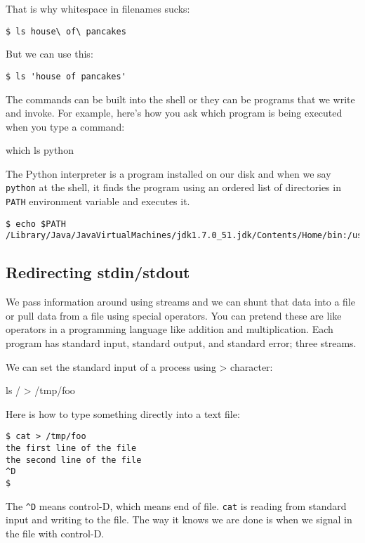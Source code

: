 \begin{fullwidth}
That is why whitespace in filenames sucks:

\begin{lstlisting}[style=BashInputStyle]
$ ls house\ of\ pancakes
\end{lstlisting}

\noindent But we can use this:

\begin{lstlisting}[style=BashInputStyle]
$ ls 'house of pancakes'
\end{lstlisting}

The commands can be built into the shell or they can be programs that we write and invoke.  For example, here's how you ask which program is being executed when you type a command:

{\small
\bash[script,stdout,prefix=$]
which ls python
\END
}

The Python interpreter is a program installed on our disk and when we say {\tt python} at the shell, it finds the program using an ordered list of directories in {\tt PATH} environment variable and executes it.

\begin{lstlisting}[style=BashInputStyle]
$ echo $PATH
/Library/Java/JavaVirtualMachines/jdk1.7.0_51.jdk/Contents/Home/bin:/usr/local/bin:...
\end{lstlisting}

\subsection{Redirecting stdin/stdout}

We pass information around using streams and we can shunt that data into a file or pull data from a file using special operators. You can pretend these are like operators in a programming language like addition and multiplication. Each program has standard input, standard output, and standard error; three streams. 

We can set the standard input of a process using > character:

{\small
\bash[script,stdout,prefix=$]
ls / > /tmp/foo
\END
}

Here is how to type something directly into a text file:
 
\begin{lstlisting}[style=BashInputStyle]
$ cat > /tmp/foo
the first line of the file
the second line of the file
^D
$ 
\end{lstlisting}

\noindent The {\tt \^{}D} means control-D, which means end of file.  {\tt cat} is reading from standard input and writing to the file. The way it knows we are done is when we signal in the file with control-D.


\end{fullwidth}
